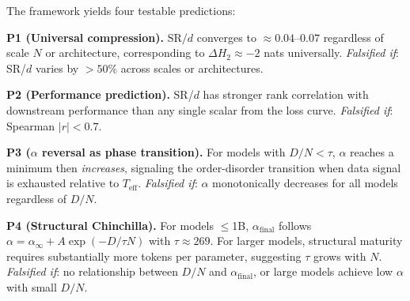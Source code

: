 The framework yields four testable predictions:

\noindent\textbf{P1 (Universal compression).} $\mathrm{SR}/d$ converges to $\approx 0.04$--$0.07$ regardless of scale $N$ or architecture, corresponding to $\Delta H_2 \approx -2$ nats universally.
\emph{Falsified if}: SR/$d$ varies by $>50\%$ across scales or architectures.

\noindent\textbf{P2 (Performance prediction).} SR/$d$ has stronger rank correlation with downstream performance than any single scalar from the loss curve.
\emph{Falsified if}: Spearman $|r| < 0.7$.

\noindent\textbf{P3 ($\alpha$ reversal as phase transition).} For models with $D/N < \tau$, $\alpha$ reaches a minimum then \emph{increases}, signaling the order-disorder transition when data signal is exhausted relative to $T_{\mathrm{eff}}$.
\emph{Falsified if}: $\alpha$ monotonically decreases for all models regardless of $D/N$.

\noindent\textbf{P4 (Structural Chinchilla).} For models $\leq$1B, $\alpha_{\mathrm{final}}$ follows $\alpha = \alpha_\infty + A\exp(-D/\tau N)$ with $\tau \approx 269$. For larger models, structural maturity requires substantially more tokens per parameter, suggesting $\tau$ grows with $N$.
\emph{Falsified if}: no relationship between $D/N$ and $\alpha_{\mathrm{final}}$, or large models achieve low $\alpha$ with small $D/N$.
